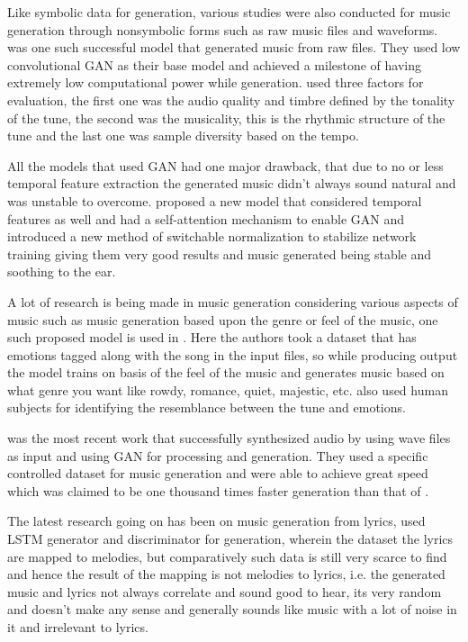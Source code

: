 \documentclass[oneside,12pt]{Classes/RoboticsLaTeX}
\begin{document}
Like symbolic data for generation, various studies were also conducted for music generation through nonsymbolic forms such as raw music files and waveforms. \cite{mp3net} was one such successful model that generated music from raw files. They used low convolutional GAN as their base model and achieved a milestone of having extremely low computational power while generation. \cite{mp3net} used three factors for evaluation, the first one was the audio quality and timbre defined by the tonality of the tune, the second was the musicality, this is the rhythmic structure of the tune and the last one was sample diversity based on the tempo.

All the models that used GAN had one major drawback, that due to no or less temporal feature extraction the generated music didn't always sound natural and was unstable to overcome. \cite{dmbgan} proposed a new model that considered temporal features as well and had a self-attention mechanism to enable GAN and introduced a new method of switchable normalization to stabilize network training giving them very good results and music generated being stable and soothing to the ear.

A lot of research is being made in music generation considering various aspects of music such as music generation based upon the genre or feel of the music, one such proposed model is used in \cite{cvaegan}. Here the authors took a dataset that has emotions tagged along with the song in the input files, so while producing output the model trains on basis of the feel of the music and generates music based on what genre you want like rowdy, romance, quiet, majestic, etc. \cite{cvaegan} also used human subjects for identifying the resemblance between the tune and emotions.

\cite{gansynth} was the most recent work that successfully synthesized audio by using wave files as input and using GAN for processing and generation. They used a specific controlled dataset for music generation and were able to achieve great speed which was claimed to be one thousand times faster generation than that of  \cite{wavenet}.

The latest research going on has been on music generation from lyrics, \cite{lstmgan} used LSTM generator and discriminator for generation, wherein the dataset the lyrics are mapped to melodies, but comparatively such data is still very scarce to find and hence the result of the mapping is not melodies to lyrics, i.e. the generated music and lyrics not always correlate and sound good to hear, its very random and doesn't make any sense and generally sounds like music with a lot of noise in it and irrelevant to lyrics.
\end{document}
